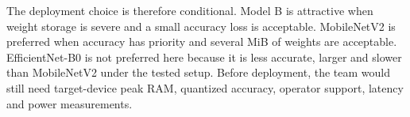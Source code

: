 The deployment choice is therefore conditional. Model B is attractive when
weight storage is severe and a small accuracy loss is acceptable. MobileNetV2
is preferred when accuracy has priority and several MiB of weights are
acceptable. EfficientNet-B0 is not preferred here because it is less accurate,
larger and slower than MobileNetV2 under the tested setup. Before deployment,
the team would still need target-device peak RAM, quantized accuracy, operator
support, latency and power measurements.
